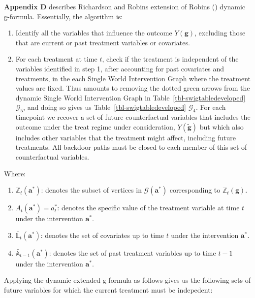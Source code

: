 \documentclass[
  single column]{article}
\providecommand{\tightlist}{%
  \setlength{\itemsep}{0pt}\setlength{\parskip}{0pt}}\usepackage{longtable,booktabs,array}
\begin{document}
\textbf{Appendix D} describes Richardson and Robins extension of Robins
() dynamic g-formula. Essentially, the
algorithm is:

\begin{enumerate}
\def\labelenumi{\arabic{enumi}.}
\item
  Identify all the variables that influence the outcome
  \(Y(\mathbf{g})\), excluding those that are current or past treatment
  variables or covariates.
\item
  For each treatment at time \(t\), check if the treatment is
  independent of the variables identified in step 1, after accounting
  for past covariates and treatments, in the each Single World
  Intervention Graph where the treatment values are fixed. Thus amounts
  to removing the dotted green arrows from the dynamic Single World
  Intervention Graph in Table~\ref{tbl-swigtabledeveloped}
  \(\mathcal{G}_5\), and doing so gives us
  Table~\ref{tbl-swigtabledeveloped} \(\mathcal{G}_4\). For each
  timepoint we recover a set of future counterfactual variables that
  includes the outcome under the treat regime under consideration,
  \(Y(\mathbf{\tilde{g}})\) but which also includes other variables that
  the treatment might affect, including future treatments. All backdoor
  paths must be closed to each member of this set of counterfactual
  variables.
\end{enumerate}

Where:

\begin{enumerate}
\def\labelenumi{\arabic{enumi}.}
\tightlist
\item
  \textbf{\(\mathbb{Z}_t(\mathbf{a}^*)\)}: denotes the subset of
  vertices in \(\mathcal{G}(\mathbf{a}^*)\) corresponding to
  \(\mathbb{Z}_t(\mathbf{g})\).
\item
  \textbf{\(A_t(\mathbf{a}^*) = a^*_t\)}: denotes the specific value of
  the treatment variable at time \(t\) under the intervention
  \(\mathbf{a}^*\).
\item
  \textbf{\(\bar{\mathbb{L}}_t(\mathbf{a}^*)\)}: denotes the set of
  covariates up to time \(t\) under the intervention \(\mathbf{a}^*\).
\item
  \textbf{\(\bar{\mathbb{A}}_{t-1}(\mathbf{a}^*)\)}: denotes the set of
  past treatment variables up to time \(t-1\) under the intervention
  \(\mathbf{a}^*\).
\end{enumerate}

Applying the dynamic extended g-formula as follows gives us the
following sets of future variables for which the current treatment must
be indepedent:
\end{document}

